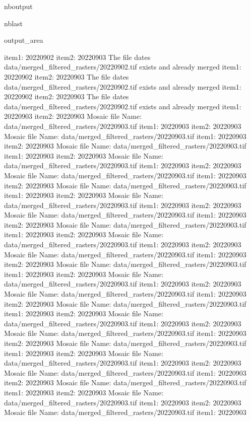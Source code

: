 \documentclass[letterpaper,10pt]{sphinxmanual}
\begin{document}
\begin{sphinxuseclass}{nboutput}
\begin{sphinxuseclass}{nblast}
{\begin{sphinxuseclass}{output_area}
\begin{sphinxuseclass}{}
\begin{sphinxVerbatim}[commandchars=\\\{\}]
item1:  20220902
item2:  20220903
The file dates data/merged\_filtered\_rasters/20220902.tif exists and already merged
item1:  20220902
item2:  20220903
The file dates data/merged\_filtered\_rasters/20220902.tif exists and already merged
item1:  20220902
item2:  20220903
The file dates data/merged\_filtered\_rasters/20220902.tif exists and already merged
item1:  20220903
item2:  20220903
Mosaic file Name:  data/merged\_filtered\_rasters/20220903.tif
item1:  20220903
item2:  20220903
Mosaic file Name:  data/merged\_filtered\_rasters/20220903.tif
item1:  20220903
item2:  20220903
Mosaic file Name:  data/merged\_filtered\_rasters/20220903.tif
item1:  20220903
item2:  20220903
Mosaic file Name:  data/merged\_filtered\_rasters/20220903.tif
item1:  20220903
item2:  20220903
Mosaic file Name:  data/merged\_filtered\_rasters/20220903.tif
item1:  20220903
item2:  20220903
Mosaic file Name:  data/merged\_filtered\_rasters/20220903.tif
item1:  20220903
item2:  20220903
Mosaic file Name:  data/merged\_filtered\_rasters/20220903.tif
item1:  20220903
item2:  20220903
Mosaic file Name:  data/merged\_filtered\_rasters/20220903.tif
item1:  20220903
item2:  20220903
Mosaic file Name:  data/merged\_filtered\_rasters/20220903.tif
item1:  20220903
item2:  20220903
Mosaic file Name:  data/merged\_filtered\_rasters/20220903.tif
item1:  20220903
item2:  20220903
Mosaic file Name:  data/merged\_filtered\_rasters/20220903.tif
item1:  20220903
item2:  20220903
Mosaic file Name:  data/merged\_filtered\_rasters/20220903.tif
item1:  20220903
item2:  20220903
Mosaic file Name:  data/merged\_filtered\_rasters/20220903.tif
item1:  20220903
item2:  20220903
Mosaic file Name:  data/merged\_filtered\_rasters/20220903.tif
item1:  20220903
item2:  20220903
Mosaic file Name:  data/merged\_filtered\_rasters/20220903.tif
item1:  20220903
item2:  20220903
Mosaic file Name:  data/merged\_filtered\_rasters/20220903.tif
item1:  20220903
item2:  20220903
Mosaic file Name:  data/merged\_filtered\_rasters/20220903.tif
item1:  20220903
item2:  20220903
Mosaic file Name:  data/merged\_filtered\_rasters/20220903.tif
item1:  20220903
item2:  20220903
Mosaic file Name:  data/merged\_filtered\_rasters/20220903.tif
item1:  20220903
item2:  20220903
Mosaic file Name:  data/merged\_filtered\_rasters/20220903.tif
item1:  20220903
item2:  20220903
Mosaic file Name:  data/merged\_filtered\_rasters/20220903.tif
item1:  20220903
item2:  20220903
Mosaic file Name:  data/merged\_filtered\_rasters/20220903.tif
item1:  20220903
item2:  20220903
Mosaic file Name:  data/merged\_filtered\_rasters/20220903.tif
item1:  20220903

\end{sphinxVerbatim}
\end{sphinxuseclass}
\end{sphinxuseclass}}
\end{sphinxuseclass}
\end{sphinxuseclass}
\end{document}
